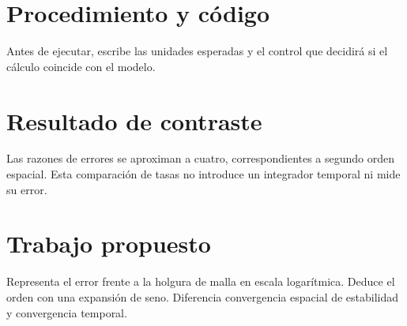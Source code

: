 \section{Procedimiento y código}

Antes de ejecutar, escribe las unidades esperadas y el control que decidirá si el cálculo coincide con el modelo.



\section{Resultado de contraste}

Las razones de errores se aproximan a cuatro, correspondientes a segundo orden espacial. Esta comparación de tasas no introduce un integrador temporal ni mide su error.

\section{Trabajo propuesto}

Representa el error frente a la holgura de malla en escala logarítmica. Deduce el orden con una expansión de seno. Diferencia convergencia espacial de estabilidad y convergencia temporal.

\studiumchaptercheck
